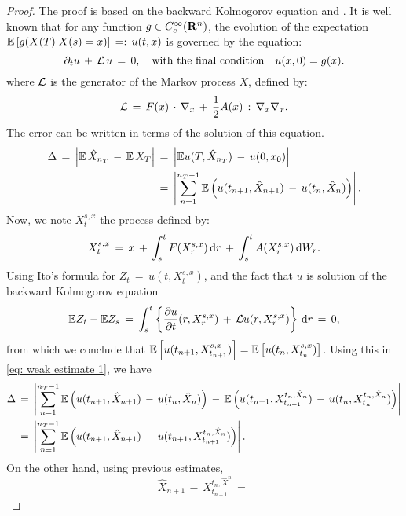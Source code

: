 \begin{proof}
    The proof is based on the backward Kolmogorov equation
    \cite{kloeden1992numerical} and \cite{weinan2005analysis}. It is well known
    that for any function $g \in \test{\real^n}$, the evolution of the
    expectation $\expect \left[g(X(T)| X(s) = x)\right] \,=: \, u(t,x)$ is governed by the equation:
    \begin{equation*}
        \pard{u}{t} \,+\,\op L\,u  \,=\,0,  \quad \text{with the final condition} \quad u(x,0) =
        g(x). 
    \end{equation*}
    where $\op L$ is the generator of the Markov process $X$, defined by:
    \begin{equation*}
            \op L \,=\,F(x) \dotx \grad_x \,+\,\frac{1}{2} A(x)\,:\,\grad_x \grad_x.
    \end{equation*}
    The error can be written in terms of the solution of this equation.
    \begin{equation}
        \begin{aligned}
            \Delta \,=\, \abs{ \expect\, \hat X_{n_T}\,-\,\expect\, X_T } &\,=\, \abs{ \expect u(T,\hat X_{n_T}) \,-\,u(0,x_0) } \\
            &\,=\, \abs{ \sum_{n=1}^{n_T-1}\expect \left( u(t_{n+1}, \hat X_{n+1}) \,-\, u(t_n, \hat X_n) \right)}.
        \end{aligned}
        \label{eq: weak estimate 1}
    \end{equation}
    Now, we note $X_t^{s,x}$ the process defined by:
    \begin{equation*}
        X_t^{s,x} \,=\, x \,+\, \int_s^t F(X_r^{s,x}) \d r \,+\, \int_s^t A(X_r^{s,x})  \d W_r.
    \end{equation*}
    Using Ito's formula for $Z_t \,=\, u(t,X_t^{s,x})$, and the fact that $u$
    is solution of the backward Kolmogorov equation
    \begin{equation*}
        \expect Z_t - \expect Z_s \,=\, \int_s^t \left\{\pardl{u}{t}(r, X_r^{s,x}) \,+\, \op Lu(r, X_r^{s,x}) \right\} \d r \,=\, 0,
    \end{equation*}
    from which we conclude that $\expect \left[u(t_{n+1},
        X_{t_{n+1}}^{s,x})\right] = \expect \left[u(t_n,
        X_{t_n}^{s,x})\right]$. Using this in \cref{eq: weak estimate 1}, we have
    \begin{equation*}
        \begin{aligned}
            \Delta &\,=\, \abs{ \sum_{n=1}^{n_T-1}\expect \left( u(t_{n+1}, \hat
                X_{n+1}) \,-\, u(t_n, \hat X_n) \right)
            \,-\,\expect\left(u(t_{n+1}, X^{t_{n},\hat X_n}_{t_{n+1}})
                \,-\,u(t_n,X^{t_n,\hat X_n}_{t_n})\right) } \\
        & \,=\, \abs{ \sum_{n=1}^{n_T-1} \expect \left( u(t_{n+1}, \hat
                X_{n+1}) \,-\, u(t_{n+1}, X^{t_{n},\hat X_n}_{t_{n+1}}) \right) }.
        \end{aligned}
    \end{equation*}
    On the other hand, using previous estimates,
    \begin{equation*}
        \hat X_{n+1} \,-\, X^{t_n,\hat X^n}_{t_{n+1}} \,=\,  
    \end{equation*}
\end{proof}
